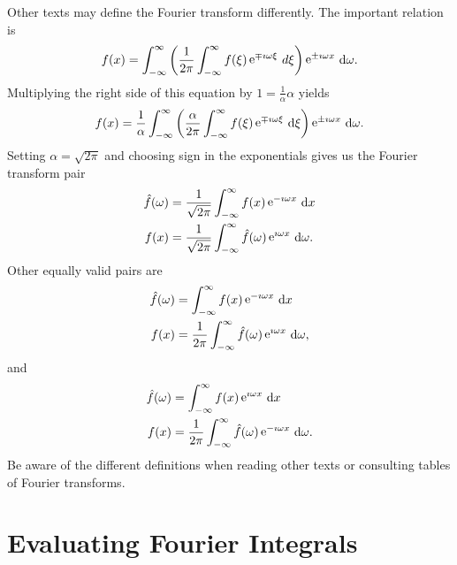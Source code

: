 Other texts may define the Fourier transform differently.  The important
relation is
\[ 
f(x) = \int_{-\infty}^\infty \left( \frac{1}{2\pi} \int_{-\infty}^\infty f(\xi) \mathop{\mathrm{e}}\nolimits^{ \mp \imath \omega \xi}\,
  d \xi \right) \mathop{\mathrm{e}}\nolimits^{\pm \imath \omega x}\,\mathrm{d} \omega.
\]
Multiplying the right side of this equation by $1 = \frac{1}{\alpha} \alpha$
yields
\[ 
f(x) = \frac{1}{\alpha} \int_{-\infty}^\infty \left( \frac{\alpha}{2\pi} \int_{-\infty}^\infty f(\xi)
  \mathop{\mathrm{e}}\nolimits^{\mp \imath \omega \xi}\,\mathrm{d} \xi \right) \mathop{\mathrm{e}}\nolimits^{\pm \imath \omega x}\,\mathrm{d} \omega.
\]
Setting $\alpha = \sqrt{2\pi}$ and choosing sign in the exponentials gives 
us the Fourier transform pair
\begin{align*}
  \hat{f}(\omega) &= \frac{1}{\sqrt{2\pi}} \int_{-\infty}^\infty f(x) \mathop{\mathrm{e}}\nolimits^{-\imath \omega x}\,\mathrm{d} x 
  \\
  f(x) &= \frac{1}{\sqrt{2\pi}} \int_{-\infty}^\infty \hat{f}(\omega) \mathop{\mathrm{e}}\nolimits^{\imath \omega x}\,\mathrm{d} \omega.     
\end{align*}
Other equally valid pairs are
\begin{align*}
  \hat{f}(\omega) &= \int_{-\infty}^\infty f(x) \mathop{\mathrm{e}}\nolimits^{-\imath \omega x}\,\mathrm{d} x 
  \\
  f(x) &= \frac{1}{2\pi} \int_{-\infty}^\infty \hat{f}(\omega) \mathop{\mathrm{e}}\nolimits^{\imath \omega x}\,\mathrm{d} \omega,
\end{align*}
and
\begin{align*}
  \hat{f}(\omega) &= \int_{-\infty}^\infty f(x) \mathop{\mathrm{e}}\nolimits^{\imath \omega x}\,\mathrm{d} x 
  \\
  f(x) &= \frac{1}{2\pi} \int_{-\infty}^\infty \hat{f}(\omega) \mathop{\mathrm{e}}\nolimits^{-\imath \omega x}\,\mathrm{d} \omega.   
\end{align*}
Be aware of the different definitions 
when reading other texts or consulting tables of Fourier
transforms.




















\section{Evaluating Fourier Integrals}




